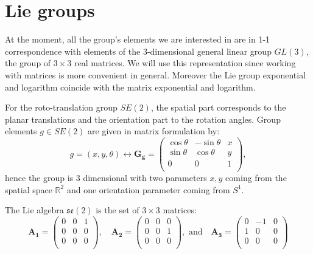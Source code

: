 \documentclass{article}
\begin{document}
\clearpage

\section{Lie groups} \label{sec:lie_groups}

At the moment, all the group's elements we are interested in are in 1-1 correspondence with elements of the 3-dimensional general linear group $GL(3)$, the group of $3 \times 3$ real matrices. We will use this representation since working with matrices is more convenient in general. Moreover the Lie group exponential and logarithm coincide with the matrix exponential and logarithm.

For the roto-translation group  $SE(2)$, the spatial part corresponds to the planar translations and the orientation part to the rotation angles. Group elements $g \in SE(2)$ are given in matrix formulation by:
\begin{equation}
g = (x, y, \theta) \leftrightarrow 
\boldsymbol{G_g} = 
\left(
\begin{array}{ccc}
\cos \theta & - \sin \theta & x \\
\sin \theta & \cos \theta & y \\
0 & 0 & 1 \\
\end{array}
\right),
\end{equation}
hence the group is 3 dimensional with two parameters $x,y$ coming from the spatial space $\mathbb{R}^2$ and one orientation parameter coming from $S^1$.

The Lie algebra $\mathfrak{se}(2)$ is the set of $3 \times 3$ matrices:
\begin{equation}
\boldsymbol{A_1} = 
\left(
\begin{array}{ccc}
0 & 0 & 1 \\
0 & 0 & 0 \\
0 & 0 & 0 \\
\end{array}
\right)
, \quad
\boldsymbol{A_2} = 
\left(
\begin{array}{ccc}
0 & 0 & 0  \\
0 & 0 & 1 \\
0 & 0 & 0 \\
\end{array}
\right)
, \text{ and} \quad
\boldsymbol{A_3} = 
\left(
\begin{array}{ccc}
0 & -1 & 0 \\
1 & 0 & 0 \\
0 & 0 & 0 \\
\end{array}
\right)
\end{equation}
\end{document}
